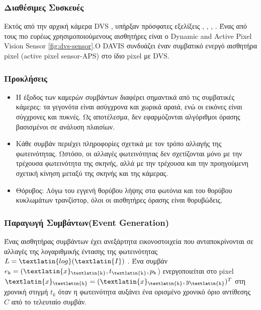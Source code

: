 \documentclass[12pt]{report}
\begin{document}
\subsubsection{Διαθέσιμες Συσκευές}
Εκτός από την αρχική κάμερα DVS \cite{Lichtsteiner2008}, υπήρξαν πρόσφατες εξελίξεις \cite{posch2014} , \cite{liu2015}, \cite{indiveri2015}, \cite{delbruck2010} .
Ένας από τους πιο ευρέως χρησιμοποιούμενους αισθητήρες είναι ο \textlatin{Dynamic and Active Pixel Vision Sensor} \cite{davis} \ref{fig:dvs-sensor}.Ο \textlatin{DAVIS } συνδυάζει έναν συμβατικό ενεργό αισθητήρα pixel (\textlatin{active pixel sensor}-\textlatin{APS})  \cite{fossum1997}  στο ίδιο pixel με DVS.
\subsubsection{Προκλήσεις}
\begin{itemize}
    \item Η έξοδος των καμερών συμβάντων διαφέρει σημαντικά από τις συμβατικές κάμερες: τα γεγονότα είναι ασύγχρονα και χωρικά αραιά, ενώ οι εικόνες είναι σύγχρονες και πυκνές. Ως αποτέλεσμα, δεν εφαρμόζονται αλγόριθμοι όρασης βασισμένοι σε ανάλυση πλαισίων.
    \item Κάθε συμβάν περιέχει πληροφορίες σχετικά με τον τρόπο αλλαγής της φωτεινότητας. Ωστόσο, οι αλλαγές φωτεινότητας δεν σχετίζονται μόνο με την τρέχουσα φωτεινότητα της σκηνής, αλλά με την τρέχουσα και την προηγούμενη σχετική κίνηση μεταξύ της σκηνής και της κάμερας.
    \item Θόρυβος: Λόγω του εγγενή θορύβου λήψης στα φωτόνια και του θορύβου κυκλωμάτων τρανζίστορ, όλοι οι αισθητήρες όρασης είναι θορυβώδεις.
\end{itemize}
\subsubsection{Παραγωγή Συμβάντων(\textlatin{Event Generation})}

Ένας αισθητήρας συμβάντων \cite{Lichtsteiner2008} έχει ανεξάρτητα εικονοστοιχεία που ανταποκρίνονται
σε αλλαγές της λογαριθμικής έντασης της φωτεινότητας $L=\textlatin{log}(\textlatin{I})$ . Ένα συμβάν $e\textsubscript{k}=(\textlatin{x}\textsubscript{\textlatin{k}},t\textsubscript{\textlatin{k}},p\textsubscript{k}$) ενεργοποιείται στο \textlatin{pixel} $\textlatin{x}\textsubscript{\textlatin{k}}=(\textlatin{x}\textsubscript{\textlatin{k}},y\textsubscript{\textlatin{k}})^T$ στη χρονική στιγμή $t_k$ όταν η φωτεινότητα αυξάνει ένα ορισμένο χρονικό όριο αντίθεσης $C$ από το τελευταίο συμβάν.
\end{document}
